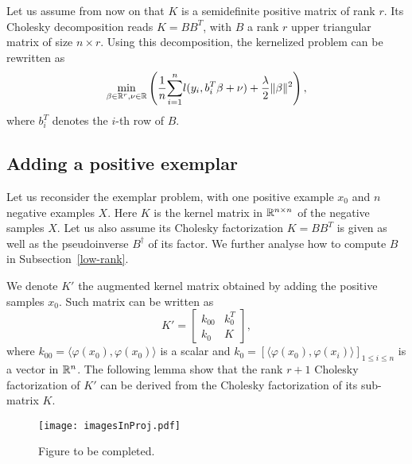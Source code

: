 
Let us assume from now on that $K$ is a semidefinite positive matrix
of rank $r$. Its Cholesky decomposition reads $K=BB^T$, with $B$ a rank $r$ upper triangular matrix of size $n\times r$. Using this decomposition, the kernelized problem can be rewritten as 
\begin{equation}
\min_{\beta\in\mathbb R^r,\nu\in\mathbb R} \left( \dfrac{1}{n}\displaystyle{\sum_{i=1}^n} l(y_i, b_i^T\beta+\nu)+\dfrac{\lambda}{2}\|\beta\|^2\right), \label{beta:first}
\end{equation}
where $b_i^T$ denotes the $i$-th row of $B$.

\subsection{Adding a positive exemplar}
Let us reconsider the exemplar problem, with one positive example $x_0$ and $n$ negative examples $X$. Here $K$ is the kernel matrix in $\mathbb R^{n\times n}$ of the negative samples $X$. 
Let us also assume its Cholesky factorization $K=BB^T$ is given as well as the pseudoinverse $B^\dagger$ of its factor. We further analyse how to compute $B$ in Subsection~\ref{low-rank}.

We denote $K'$ the augmented kernel matrix obtained by adding the positive samples $x_0$. Such matrix can be written as
\begin{equation}
K' = \begin{bmatrix}
k_{00} & k_0^T\\
k_0 & K
\end{bmatrix},
\end{equation}
where $k_{00}=\langle \varphi(x_0),\varphi(x_0)\rangle$ is a scalar and $k_0= [\langle \varphi(x_0),\varphi(x_i)\rangle]_{1\le i\le n}$ is a vector in $\mathbb R^n$. 
The following lemma show that the rank $r+1$ Cholesky factorization of $K'$ can be derived from the Cholesky factorization of its sub-matrix $K$.

\begin{figure}[!h]
\centering
\texttt{[image: imagesInProj.pdf]}
\caption{Figure to be completed.}
\label{proj}
\end{figure}

